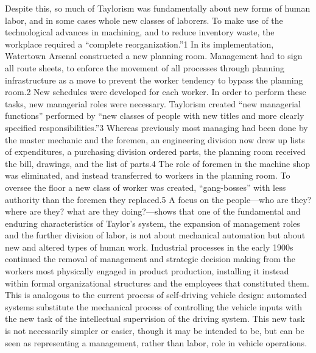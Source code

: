 Despite this, so much of Taylorism was fundamentally about new forms
of human labor, and in some cases whole new classes of laborers. To
make use of the technological advances in machining, and to reduce
inventory waste, the workplace required a “complete reorganization.”1
In its implementation, Watertown Arsenal constructed a new planning
room. Management had to sign all route sheets, to enforce the movement
of all processes through planning infrastructure as a move to prevent
the worker tendency to bypass the planning room.2 New schedules were
developed for each worker. In order to perform these tasks, new
managerial roles were necessary. Taylorism created “new managerial
functions” performed by “new classes of people with new titles and
more clearly specified responsibilities.”3 Whereas previously most
managing had been done by the master mechanic and the foremen, an
engineering division now drew up lists of expenditures, a purchasing
division ordered parts, the planning room received the bill, drawings,
and the list of parts.4 The role of foremen in the machine shop was
eliminated, and instead transferred to workers in the planning room.
To oversee the floor a new class of worker was created, “gang-bosses”
with less authority than the foremen they replaced.5 A focus on the
people—who are they? where are they? what are they doing?—shows that
one of the fundamental and enduring characteristics of Taylor's
system, the expansion of management roles and the further division of
labor, is not about mechanical automation but about new and altered
types of human work. Industrial processes in the early 1900s continued
the removal of management and strategic decision making from the
workers most physically engaged in product production, installing it
instead within formal organizational structures and the employees that
constituted them. This is analogous to the current process of
self-driving vehicle design: automated systems substitute the
mechanical process of controlling the vehicle inputs with the new task
of the intellectual supervision of the driving system. This new task
is not necessarily simpler or easier, though it may be intended to be,
but can be seen as representing a management, rather than labor, role
in vehicle operations.

